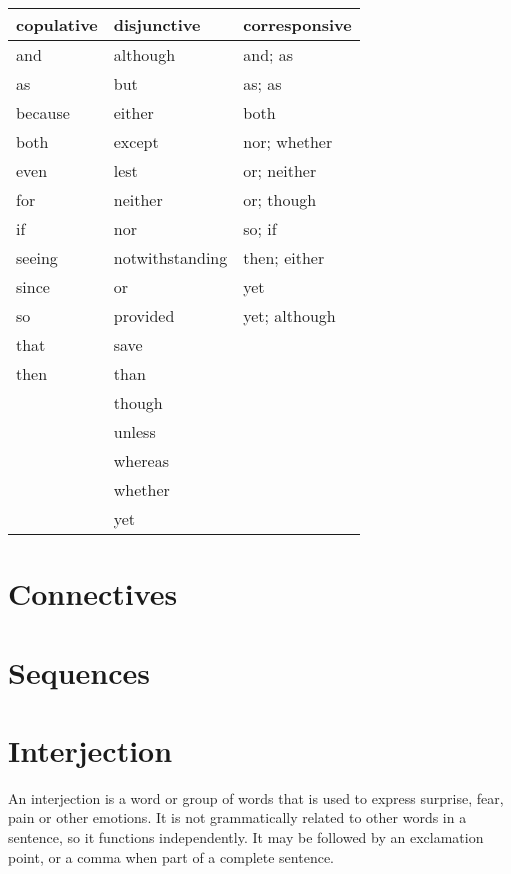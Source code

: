 \documentclass{book}
\begin{document}
\begin{tabular}{|l|l|l|}
	\hline
	copulative & disjunctive     & corresponsive \\ 
	\hline
	and        & although        & and; as       \\ 
	as         & but             & as; as        \\ 
	because    & either          & both          \\ 
	both       & except          & nor; whether  \\ 
	even       & lest            & or; neither   \\ 
	for        & neither         & or; though    \\ 
	if         & nor             & so; if        \\ 
	seeing     & notwithstanding & then; either  \\ 
	since      & or              & yet           \\ 
	so         & provided        & yet; although \\ 
	that       & save            & ~             \\ 
	then       & than            & ~             \\ 
	~          & though          & ~             \\ 
	~          & unless          & ~             \\ 
	~          & whereas         & ~             \\ 
	~          & whether         & ~             \\ 
	~          & yet             & ~             \\
	\hline
\end{tabular}




\chapter{Connectives}



\chapter{Sequences}

\chapter{Interjection}

An interjection is a word or group of words that is used to express surprise, fear, pain or other emotions. It is not grammatically related to other words in a sentence, so it functions independently. It may be followed by an exclamation point, or a comma when part of a complete sentence.
\end{document}
